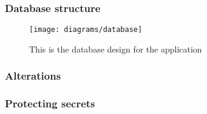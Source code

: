 \subsubsection*{Database structure}

\begin{figure}[p]
    \centering
    \texttt{[image: diagrams/database]}
    \caption{This is the database design for the application}
    \label{fig:diagram_database_image}
\end{figure}

\subsubsection*{Alterations}

\subsubsection*{Protecting secrets}